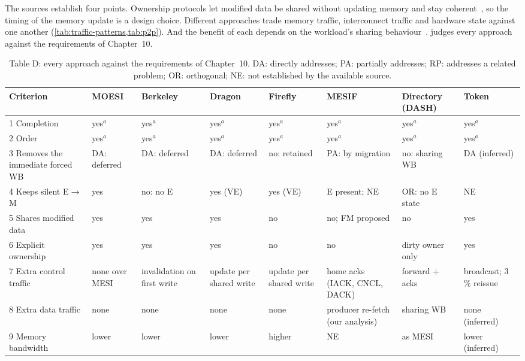 The sources establish four points. Ownership protocols let modified data be shared
without updating memory and stay coherent~\cite{sweazey1986moesi,archibald1986evaluation},
so the timing of the memory update is a design choice. Different approaches trade
memory traffic, interconnect traffic and hardware state against one another
(\cref{tab:traffic-patterns,tab:p2p}). And the benefit of each depends on the
workload's sharing
behaviour~\cite[p.~295]{archibald1986evaluation}\cite{fagundes2024evaluation,loughlin2022moesiprime}.
 judges every approach against the requirements of Chapter~10.

\begin{table}[htbp]
\centering
\caption{Table D: every approach against the requirements of Chapter~10.
DA: directly addresses; PA: partially addresses; RP: addresses a related
problem; OR: orthogonal; NE: not established by the available source.}
\label{tab:matrix}
\scriptsize
\begin{tabular}{@{}L{2.05cm} L{1.4cm} L{1.4cm} L{1.4cm} L{1.4cm} L{1.4cm} L{1.4cm} L{1.4cm}@{}}
\toprule
Criterion & MOESI & Berkeley & Dragon & Firefly & MESIF & Directory (DASH) & Token \\
 Completion & yes$^{a}$ & yes$^{a}$ & yes$^{a}$ & yes$^{a}$ & yes$^{a}$ & yes$^{a}$ & yes$^{a}$ \\
2 Order & yes$^{a}$ & yes$^{a}$ & yes$^{a}$ & yes$^{a}$ & yes$^{a}$ & yes$^{a}$ & yes$^{a}$ \\
3 Removes the immediate forced WB & DA: deferred & DA: deferred & DA: deferred &
  no: retained & PA: by migration & no: sharing WB & DA (inferred) \\
4 Keeps silent E$\to$M & yes & no: no E & yes (VE) & yes (VE) & E present; NE &
  OR: no E state & NE \\
5 Shares modified data & yes & yes & yes & no & no; FM proposed & no & yes \\
6 Explicit ownership & yes & yes & yes & no & no & dirty owner only & yes \\
7 Extra control traffic & none over MESI & invalidation on first write &
  update per shared write & update per shared write & home acks (IACK, CNCL,
  DACK) & forward + acks & broadcast; 3\,\% reissue \\
8 Extra data traffic & none & none & none & none & producer re-fetch (our
  analysis) & sharing WB & none (inferred) \\
9 Memory bandwidth & lower & lower & lower & higher & NE & as MESI & lower
  (inferred) \\

\end{tabular}
\end{table}
